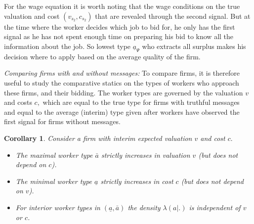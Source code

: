 \documentclass[12pt]{article}
\newtheorem{corollary}[theorem]{Corollary}
\begin{document}
For the wage equation it is worth noting that the wage conditions on the
true valuation and cost $(v_{s_{2}},c_{s_{2}})$ that are revealed through the second
signal. But at the time where the worker decides which job to bid for, he only has the first signal as he has not spent enough time on preparing his bid to know all the information about the job. So lowest type $\underline{a}_{\Psi }$ who extracts all surplus makes his decision where to apply based on the average quality of the firm. 

\bigskip

\textit{Comparing firms with and without messages:} To compare firms, it is therefore useful to study the comparative statics on the types
of workers who approach these firms, and their bidding. The worker types are
governed by the valuation $v$ and costs $c,$ which are equal to the true
type for firms with truthful messages and equal to the average (interim)
type given after workers have observed the first signal for firms without
messages.

\begin{corollary}
\label{corollary}Consider a firm with interim expected valuation $v$ and cost 
$c.$

\begin{itemize}
\item The maximal worker type $\bar{a}$ strictly increases in valuation $v$
(but does not depend on $c$).

\item The minimal worker type $\underline{a}$ strictly increases in cost $c$ (but does not depend on $v$).

\item For interior worker types in $(\underline{a}, \bar{a})$ the density $\lambda (a|.)$ is independent of $v$ or $c$.
\end{itemize}
\end{corollary}
\end{document}
